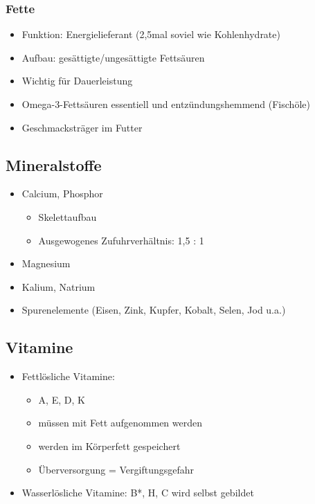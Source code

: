        \subsubsection{Fette}
            \begin{itemize}
                \item Funktion: Energielieferant (2,5mal soviel wie Kohlenhydrate)
                \item Aufbau: gesättigte/ungesättigte Fettsäuren
                \item Wichtig für Dauerleistung
                \item Omega-3-Fettsäuren essentiell und entzündungshemmend (Fischöle)
                \item Geschmacksträger im Futter
            \end{itemize}

    \subsection{Mineralstoffe}
        \begin{itemize}
            \item Calcium, Phosphor
            \begin{itemize}
                \item Skelettaufbau
                \item Ausgewogenes Zufuhrverhältnis: 1,5 : 1
            \end{itemize}
            \item Magnesium
            \item Kalium, Natrium
            \item Spurenelemente (Eisen, Zink, Kupfer, Kobalt, Selen, Jod u.a.)
        \end{itemize}

    \subsection{Vitamine}
        \begin{itemize}
            \item Fettlösliche Vitamine:
            \begin{itemize}
                \item A, E, D, K
                \item müssen mit Fett aufgenommen werden
                \item werden im Körperfett gespeichert
                \item Überversorgung = Vergiftungsgefahr
            \end{itemize}
            \item Wasserlösliche Vitamine: B*, H, C wird selbst gebildet
        \end{itemize}



